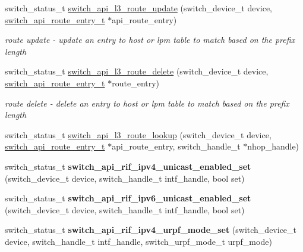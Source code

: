 \begin{DoxyCompactItemize}
switch\+\_\+status\+\_\+t \hyperlink{group__L3_ga2e42f84e2a0b7bf610a4565a9ea64120}{switch\+\_\+api\+\_\+l3\+\_\+route\+\_\+update} (switch\+\_\+device\+\_\+t device, \hyperlink{group__L3_ga969f26e2a3436107bc9b6e9f749c79b8}{switch\+\_\+api\+\_\+route\+\_\+entry\+\_\+t} $\ast$api\+\_\+route\+\_\+entry)
\begin{DoxyCompactList}\small\item\em route update -\/ update an entry to host or lpm table to match based on the prefix length \end{DoxyCompactList}\item 
switch\+\_\+status\+\_\+t \hyperlink{group__L3_gada6257e4684ba0a0c7dd6ad95a86419c}{switch\+\_\+api\+\_\+l3\+\_\+route\+\_\+delete} (switch\+\_\+device\+\_\+t device, \hyperlink{group__L3_ga969f26e2a3436107bc9b6e9f749c79b8}{switch\+\_\+api\+\_\+route\+\_\+entry\+\_\+t} $\ast$route\+\_\+entry)
\begin{DoxyCompactList}\small\item\em route delete -\/ delete an entry to host or lpm table to match based on the prefix length \end{DoxyCompactList}\item 
switch\+\_\+status\+\_\+t \hyperlink{group__L3_ga2e4def1cfd9fddeb6f037c94e019b6ee}{switch\+\_\+api\+\_\+l3\+\_\+route\+\_\+lookup} (switch\+\_\+device\+\_\+t device, \hyperlink{group__L3_ga969f26e2a3436107bc9b6e9f749c79b8}{switch\+\_\+api\+\_\+route\+\_\+entry\+\_\+t} $\ast$api\+\_\+route\+\_\+entry, switch\+\_\+handle\+\_\+t $\ast$nhop\+\_\+handle)
\item 
\hypertarget{group__L3_ga46c5a903f2d4879384d1b68cdd4c625a}{switch\+\_\+status\+\_\+t {\bfseries switch\+\_\+api\+\_\+rif\+\_\+ipv4\+\_\+unicast\+\_\+enabled\+\_\+set} (switch\+\_\+device\+\_\+t device, switch\+\_\+handle\+\_\+t intf\+\_\+handle, bool set)}\label{group__L3_ga46c5a903f2d4879384d1b68cdd4c625a}

\item 
\hypertarget{group__L3_ga13f401deae20bbf01e05901733352699}{switch\+\_\+status\+\_\+t {\bfseries switch\+\_\+api\+\_\+rif\+\_\+ipv6\+\_\+unicast\+\_\+enabled\+\_\+set} (switch\+\_\+device\+\_\+t device, switch\+\_\+handle\+\_\+t intf\+\_\+handle, bool set)}\label{group__L3_ga13f401deae20bbf01e05901733352699}

\item 
\hypertarget{group__L3_ga8e718e7d15fae61f7755649ddc87104b}{switch\+\_\+status\+\_\+t {\bfseries switch\+\_\+api\+\_\+rif\+\_\+ipv4\+\_\+urpf\+\_\+mode\+\_\+set} (switch\+\_\+device\+\_\+t device, switch\+\_\+handle\+\_\+t intf\+\_\+handle, switch\+\_\+urpf\+\_\+mode\+\_\+t urpf\+\_\+mode)}\label{group__L3_ga8e718e7d15fae61f7755649ddc87104b}


\end{DoxyCompactItemize}
